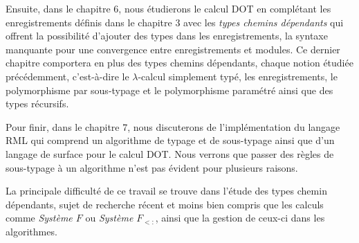 Ensuite, dans le chapitre 6, nous étudierons le calcul DOT en complétant les
enregistrements définis dans le chapitre 3 avec les \textit{types chemins
dépendants} qui offrent la possibilité d'ajouter des types dans les
enregistrements, la syntaxe manquante pour une
convergence entre enregistrements et modules. Ce dernier chapitre comportera en
plus des types chemins dépendants, chaque notion étudiée précédemment,
c'est-à-dire le $\lambda$-calcul simplement typé, les
enregistrements, le polymorphisme par sous-typage et le polymorphisme paramétré
ainsi que des types récursifs.

Pour finir, dans le chapitre 7, nous discuterons de l'implémentation du langage
RML\cite{rml-github} qui comprend un algorithme de typage et de sous-typage
ainsi que d'un langage de surface pour le
calcul DOT. Nous verrons que passer des règles de sous-typage à un algorithme
n'est pas évident pour plusieurs raisons.


La principale difficulté de ce travail se trouve dans l'étude des types
chemin dépendants, sujet de recherche récent et moins bien compris que les
calculs comme \textit{Système $F$} ou \textit{Système $F_{<:}$}, ainsi que
la gestion de ceux-ci dans les algorithmes.
